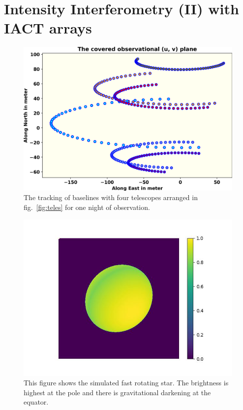\section{Intensity Interferometry (II) with IACT arrays}
\begin{figure}
  \includegraphics[width=\linewidth]{fig/baseline.png}
  \caption{The tracking of baselines with four telescopes arranged in fig.~\ref{fig:teles} for one night of observation.}
  \label{fig:base}
\end{figure}
\begin{figure}[hbt]
  \includegraphics[width=\linewidth]{fig/ellipse/ellipse1612.jpg}
  \caption{This figure shows the simulated fast rotating star. The brightness is highest at the pole and there is gravitational darkening at the equator.}
  \label{fig:image}
\end{figure}
